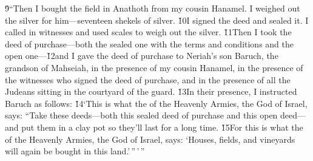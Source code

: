 \v{9}``Then I bought the field in Anathoth from my cousin Hanamel. I weighed out the silver for him---seventeen shekels of silver. \v{10}I signed the deed and sealed it. I called in witnesses and used scales to weigh out the silver. \v{11}Then I took the deed of purchase---both the sealed one with the terms and conditions and the open one---\v{12}and I gave the deed of purchase to Neriah's son Baruch, the grandson of Mahseiah, in the presence of my cousin Hanamel, in the presence of the witnesses who signed the deed of purchase, and in the presence of all the Judeans sitting in the courtyard of the guard. \v{13}In their presence, I instructed Baruch as follows: \v{14}`This is what the  of the Heavenly Armies, the God of Israel, says: ``Take these deeds---both this sealed deed of purchase and this open deed---and put them in a clay pot so they'll last for a long time. \v{15}For this is what the  of the Heavenly Armies, the God of Israel, says: `Houses, fields, and vineyards will again be bought in this land.'\,''\,'\,''

